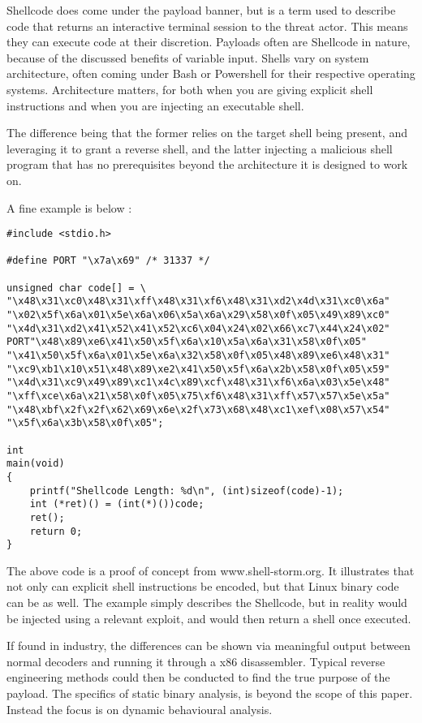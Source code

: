 Shellcode does come under the payload banner, but is a term used to describe code that returns an interactive terminal session to the threat actor. This means they can execute code at their discretion.
Payloads often are Shellcode in nature, because of the discussed benefits of variable input. Shells vary on system architecture, often coming under Bash or Powershell for their respective operating systems.
Architecture matters, for both when you are giving explicit shell instructions and when you are injecting an executable shell. 

The difference being that the former relies on the target shell being present, and leveraging it to
grant a reverse shell, and the latter injecting a malicious shell program that has no prerequisites beyond the architecture it is designed to work on.

A fine example is below \citep{x86Shellcode}:
\begin{lstlisting}[label=x86Shellcode,caption=x86 Shellcode Example]
#include <stdio.h>
  
#define PORT "\x7a\x69" /* 31337 */
  
unsigned char code[] = \
"\x48\x31\xc0\x48\x31\xff\x48\x31\xf6\x48\x31\xd2\x4d\x31\xc0\x6a"
"\x02\x5f\x6a\x01\x5e\x6a\x06\x5a\x6a\x29\x58\x0f\x05\x49\x89\xc0"
"\x4d\x31\xd2\x41\x52\x41\x52\xc6\x04\x24\x02\x66\xc7\x44\x24\x02"
PORT"\x48\x89\xe6\x41\x50\x5f\x6a\x10\x5a\x6a\x31\x58\x0f\x05"
"\x41\x50\x5f\x6a\x01\x5e\x6a\x32\x58\x0f\x05\x48\x89\xe6\x48\x31"
"\xc9\xb1\x10\x51\x48\x89\xe2\x41\x50\x5f\x6a\x2b\x58\x0f\x05\x59"
"\x4d\x31\xc9\x49\x89\xc1\x4c\x89\xcf\x48\x31\xf6\x6a\x03\x5e\x48"
"\xff\xce\x6a\x21\x58\x0f\x05\x75\xf6\x48\x31\xff\x57\x57\x5e\x5a"
"\x48\xbf\x2f\x2f\x62\x69\x6e\x2f\x73\x68\x48\xc1\xef\x08\x57\x54"
"\x5f\x6a\x3b\x58\x0f\x05";
 
int
main(void)
{
    printf("Shellcode Length: %d\n", (int)sizeof(code)-1);
    int (*ret)() = (int(*)())code;
    ret();
    return 0;
}

\end{lstlisting}

The above code is a proof of concept from www.shell-storm.org. It illustrates that not only can explicit shell instructions be encoded, but that Linux binary code can be as well.
The example simply describes the Shellcode, but in reality would be injected using a relevant exploit, and would then return a shell once executed. 

If found in industry, the differences can be shown via meaningful output between normal decoders and running it through a x86 disassembler. 
Typical reverse engineering methods could then be conducted to find the true purpose of the payload. The specifics of static binary analysis, is beyond the scope of this paper. Instead the focus is
on dynamic behavioural analysis.


